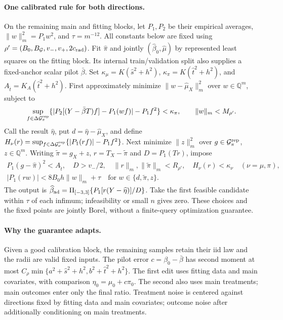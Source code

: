 \documentclass{article}
\theoremstyle{definition}
\theoremstyle{remark}
\begin{document}
\paragraph{One calibrated rule for both directions.}
On the remaining main and fitting blocks, let \(P_1,P_2\) be their
empirical averages, \(\|w\|_m^2=P_1w^2\), and \(\tau=m^{-12}\).
All constants below are fixed using
\(\rho'=(B_0,B_{\mathcal G},v_-,v_+,2c_{\rm rad})\).
Fit \(\widehat\pi\) and jointly \((\widehat\beta_0,\widehat\mu)\)
by represented least squares on the fitting block. Its internal
train/validation split also supplies a fixed-anchor scalar pilot
\(\bar\beta\). Set
\(\kappa_\mu=K(\widehat s^2+h^2)\),
\(\kappa_\pi=K(\widehat t^2+h^2)\), and
\(A_{\widehat t}=K_A(\widehat t^2+h^2)\).
First approximately minimize \(\|w-\widehat\mu_X\|_m^2\) over
\(w\in\mathbb Q^m\), subject to
\[
 \sup_{f\in\Delta\mathcal G_\pi^{\rm rep}}
 \{|P_2[(Y-\bar\beta T)f]-P_1(wf)|-P_1f^2\}<\kappa_\pi,
 \qquad \|w\|_m<M_{\rho'}.
\]
Call the result \(\widehat\eta\), put \(d=\widehat\eta-\widehat\mu_X\),
and define
\(H_\nu(r)=\sup_{f\in\Delta\mathcal G_\nu^{\rm rep}}
\{|P_1(rf)|-P_1f^2\}\).
Next minimize \(\|z\|_m^2\) over
\(g\in\mathcal G_\pi^{\rm rep}\), \(z\in\mathbb Q^m\).
Writing \(\widetilde\pi=g_X+z\), \(r=T_X-\widetilde\pi\) and
\(D=P_1(Tr)\), impose
\[
 \begin{gathered}
 P_1(g-\widehat\pi)^2<A_{\widehat t},\quad D>v_-/2,\quad
 \|r\|_m,\|\widetilde\pi\|_m<R_{\rho'},\quad
 H_\nu(r)<\kappa_\nu\quad(\nu=\mu,\pi),\\
 |P_1(rw)|<8B_0h\|w\|_m+\tau
 \quad\text{for }w\in\{d,\widetilde\pi,z\}.
 \end{gathered}
\]
The output is
\(\widehat\beta_{\rm ad}
=\Pi_{[-3,3]}\{P_1[r(Y-\widehat\eta)]/D\}\).
Take the first feasible candidate within \(\tau\) of each infimum;
infeasibility or small \(n\) gives zero. These choices and the fixed
points are jointly Borel, without a finite-query optimization guarantee.

\paragraph{Why the guarantee adapts.}
Given a good calibration block, the remaining samples retain their iid
law and the radii are valid fixed inputs. The pilot error \(c=\beta_0-\bar\beta\)
has second moment at most
\(C_\rho\min\{a^2+\widehat s^2+h^2,b^2+\widehat t^2+h^2\}\).
The first edit uses fitting data and main covariates, with comparison
\(\eta_0=\mu_0+c\pi_0\). The second also uses main treatments;
main outcomes enter only the final ratio. Treatment noise is centered
against directions fixed by fitting data and main covariates;
outcome noise after additionally conditioning on main treatments.
\end{document}
